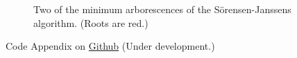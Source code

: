 \documentclass[11pt, a4paper, leqno]{article}
\begin{document}
\begin{figure}
    \centering
    \hfill  %

    \caption{Two of the minimum arborescences of the Sörensen-Janssens algorithm. (Roots are red.)}

\end{figure}

Code Appendix on \href{https://github.com/ecdogaroglu/Social-Hierarchies.git}{Github} (Under development.)
\newpage





\printbibliography
{}



\end{document}
